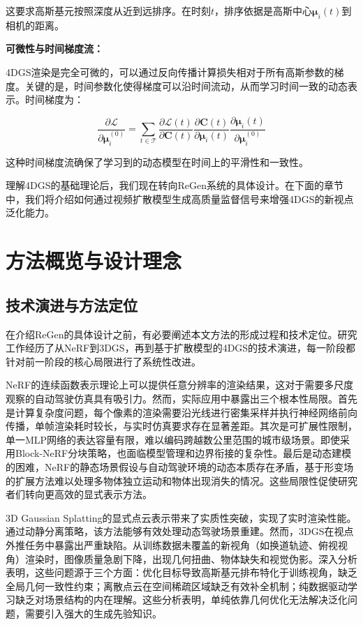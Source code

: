 这要求高斯基元按照深度从近到远排序。在时刻$t$，排序依据是高斯中心$\boldsymbol{\mu}_i(t)$到相机的距离。

\textbf{可微性与时间梯度流：}

4DGS渲染是完全可微的，可以通过反向传播计算损失相对于所有高斯参数的梯度。关键的是，时间参数化使得梯度可以沿时间流动，从而学习时间一致的动态表示。时间梯度为：

\begin{equation}
\frac{\partial \mathcal{L}}{\partial \boldsymbol{\mu}_i^{(0)}} = \sum_{t \in \mathcal{T}} \frac{\partial \mathcal{L}(t)}{\partial \mathbf{C}(t)} \frac{\partial \mathbf{C}(t)}{\partial \boldsymbol{\mu}_i(t)} \frac{\partial \boldsymbol{\mu}_i(t)}{\partial \boldsymbol{\mu}_i^{(0)}}
\label{eq:temporal_gradient}
\end{equation}

这种时间梯度流确保了学习到的动态模型在时间上的平滑性和一致性。

理解4DGS的基础理论后，我们现在转向ReGen系统的具体设计。在下面的章节中，我们将介绍如何通过视频扩散模型生成高质量监督信号来增强4DGS的新视点泛化能力。

\section{方法概览与设计理念}
\label{sec:method_overview}

\subsection{技术演进与方法定位}

在介绍ReGen的具体设计之前，有必要阐述本文方法的形成过程和技术定位。研究工作经历了从NeRF到3DGS，再到基于扩散模型的4DGS的技术演进，每一阶段都针对前一阶段的核心局限进行了系统性改进。

NeRF的连续函数表示理论上可以提供任意分辨率的渲染结果，这对于需要多尺度观察的自动驾驶仿真具有吸引力。然而，实际应用中暴露出三个根本性局限。首先是计算复杂度问题，每个像素的渲染需要沿光线进行密集采样并执行神经网络前向传播，单帧渲染耗时较长，与实时仿真要求存在显著差距。其次是可扩展性限制，单一MLP网络的表达容量有限，难以编码跨越数公里范围的城市级场景。即使采用Block-NeRF分块策略，也面临模型管理和边界衔接的复杂性。最后是动态建模的困难，NeRF的静态场景假设与自动驾驶环境的动态本质存在矛盾，基于形变场的扩展方法难以处理多物体独立运动和物体出现消失的情况。这些局限性促使研究者们转向更高效的显式表示方法。

3D Gaussian Splatting的显式点云表示带来了实质性突破，实现了实时渲染性能。通过动静分离策略，该方法能够有效处理动态驾驶场景重建。然而，3DGS在视点外推任务中暴露出严重缺陷。从训练数据未覆盖的新视角（如换道轨迹、俯视视角）渲染时，图像质量急剧下降，出现几何扭曲、物体缺失和视觉伪影。深入分析表明，这些问题源于三个方面：优化目标导致高斯基元排布特化于训练视角，缺乏全局几何一致性约束；离散点云在空间稀疏区域缺乏有效补全机制；纯数据驱动学习缺乏对场景结构的内在理解。这些分析表明，单纯依靠几何优化无法解决泛化问题，需要引入强大的生成先验知识。

